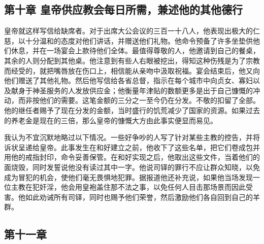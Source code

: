 \par


\subsection{第十章 皇帝供应教会每日所需，兼述他的其他德行}

皇帝就这样写信给缺席者。对于出席大公会议的三百一十八人，他表现出极大的仁慈，以十分温和的态度对他们讲话，并赠送他们礼物。他命令预备了许多坐垫供他们休息，并在一场宴会上款待他们全体。最值得尊敬的人，他邀请到自己的餐桌，其余的人则分配到其他桌。他注意到有些人右眼被挖出，得知这种伤残是为了宗教而经受的，就把嘴唇放在伤口上，相信能从亲吻中汲取祝福。宴会结束后，他又向他们赠送了其他礼物。然后他写信给各省总督，指示在每个城市中向贞女、寡妇以及献身于神圣服务的人发放供应金；他衡量年津贴的数额更多是出于自己慷慨的冲动，而非按他们的需要。这笔金额的三分之一至今仍在分发。不敬的扣留了全部。他的继任者赐予了现在分发的金额，当时盛行的饥荒减少了国家的资源。如果过去的养老金是现在的三倍，那么皇帝的慷慨大方由此事实便显而易见。\par

我认为不宜沉默地略过以下情况。一些好争吵的人写了针对某些主教的控告，并将诉状呈递给皇帝。此事发生在和好建立之前，他收下了这些名单，把它们卷成包并用他的戒指封印，命令妥善保管。在和好实现之后，他取出这些文件，当着他们的面烧毁，同时发誓说他没有读过其中一字。他说司铎的罪行不应让群众知晓，以免成为冒犯的机会，使他们毫无畏惧地犯罪。据报道他还补充说，如果他当场发现一位主教在犯奸淫，他会用皇袍盖住那不法之事，以免任何人目击那场景而因此受害。他如此劝诫所有司铎，同时也赐予他们荣誉，然后激励他们各自回到自己的羊群。\par


\subsection{第十一章}

